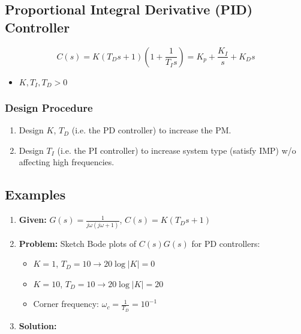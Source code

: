 \subsection{Proportional Integral Derivative (PID) Controller}
\begin{definition}
    \begin{equation}
        C(s) = K(T_D s + 1)\left(1 + \frac{1}{T_I s}\right) = K_p + \frac{K_I}{s} + K_D s
    \end{equation}
    \begin{itemize}
        \item $K,T_I,T_D >0$ 
    \end{itemize}
\end{definition}

\subsubsection{Design Procedure}
\begin{process}
    \begin{enumerate}
        \item Design $K$, $T_D$ (i.e. the PD controller) to increase the PM. 
        \item Design $T_I$ (i.e. the PI controller) to increase system type (satisfy IMP) w/o affecting high frequencies. 
    \end{enumerate}
\end{process}


\subsection{Examples}
\begin{example}
    \begin{enumerate}
        \item \textbf{Given:} $G(s) = \frac{1}{j \omega (j \omega + 1)}$, $C(s) = K(T_D s + 1)$
        \item \textbf{Problem:} Sketch Bode plots of $C(s)G(s)$ for PD controllers: 
        \begin{itemize}
            \item $K = 1$, $T_D = 10 \rightarrow 20 \log |K| = 0$
            \item $K = 10$, $T_D = 10 \rightarrow 20 \log |K| = 20$
            \item Corner frequency: $\omega_c = \frac{1}{T_D} = 10^{-1}$
        \end{itemize}
        \item \textbf{Solution:} 
    \end{enumerate}
\end{example}




